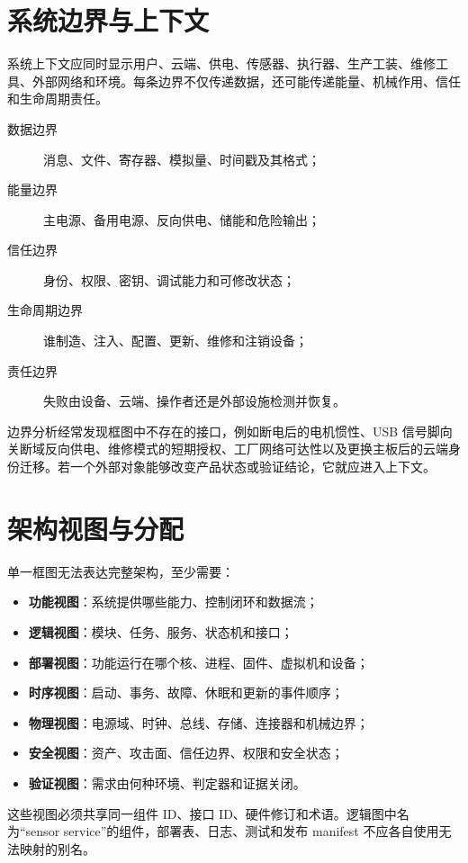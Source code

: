 \section{系统边界与上下文}

系统上下文应同时显示用户、云端、供电、传感器、执行器、生产工装、维修工具、外部网络和环境。每条边界不仅传递数据，还可能传递能量、机械作用、信任和生命周期责任。

\begin{description}
  \item[数据边界] 消息、文件、寄存器、模拟量、时间戳及其格式；
  \item[能量边界] 主电源、备用电源、反向供电、储能和危险输出；
  \item[信任边界] 身份、权限、密钥、调试能力和可修改状态；
  \item[生命周期边界] 谁制造、注入、配置、更新、维修和注销设备；
  \item[责任边界] 失败由设备、云端、操作者还是外部设施检测并恢复。
\end{description}

边界分析经常发现框图中不存在的接口，例如断电后的电机惯性、USB 信号脚向关断域反向供电、维修模式的短期授权、工厂网络可达性以及更换主板后的云端身份迁移。若一个外部对象能够改变产品状态或验证结论，它就应进入上下文。

\section{架构视图与分配}

单一框图无法表达完整架构，至少需要：

\begin{itemize}
  \item \textbf{功能视图}：系统提供哪些能力、控制闭环和数据流；
  \item \textbf{逻辑视图}：模块、任务、服务、状态机和接口；
  \item \textbf{部署视图}：功能运行在哪个核、进程、固件、虚拟机和设备；
  \item \textbf{时序视图}：启动、事务、故障、休眠和更新的事件顺序；
  \item \textbf{物理视图}：电源域、时钟、总线、存储、连接器和机械边界；
  \item \textbf{安全视图}：资产、攻击面、信任边界、权限和安全状态；
  \item \textbf{验证视图}：需求由何种环境、判定器和证据关闭。
\end{itemize}

这些视图必须共享同一组件 ID、接口 ID、硬件修订和术语。逻辑图中名为“sensor service”的组件，部署表、日志、测试和发布 manifest 不应各自使用无法映射的别名。

